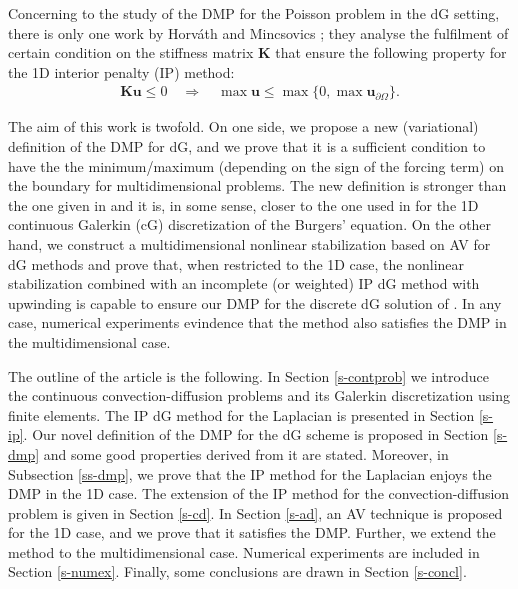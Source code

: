 Concerning to the study of the DMP for the Poisson problem in the dG setting, there is {only} one work by Horv\'ath and Mincsovics \cite{horvath_discrete_2013}; they analyse the fulfilment of certain condition on the stiffness matrix $\mathbf{K}$ that ensure the following property for the 1D interior penalty (IP) method:
\begin{align*}
\mathbf{Ku}\leq 0 \quad \Longrightarrow   \quad \max \mathbf{u} \leq \max\{0,\max \mathbf{u}_{\partial \Omega}\}. 
\end{align*} 

{The aim of this work is twofold. On one side, we propose a new (variational) definition of the DMP for dG, {and we prove that it is a sufficient condition to have the the minimum/maximum (depending on the sign of the forcing term) on the boundary for multidimensional problems}. The new definition is stronger than the one given in \cite{horvath_discrete_2013} and it is, in some sense, closer to the one used in \cite{burman_nonlinear_2007} for the 1D continuous Galerkin (cG) discretization of the Burgers' equation. On the other hand, we construct a multidimensional nonlinear stabilization based on AV for dG methods and prove that, when restricted to the 1D case, the nonlinear stabilization combined with an incomplete (or weighted) IP dG method with upwinding is capable to ensure our DMP for the discrete dG solution of . In any case, numerical experiments evindence that the method also satisfies the DMP in the multidimensional case.}


The outline of the article is the following. In Section \ref{s-contprob} we introduce the continuous convection-diffusion problems and its Galerkin discretization using finite elements. The IP dG method for the Laplacian is presented in Section \ref{s-ip}. Our novel definition of the DMP for the dG scheme is proposed in Section \ref{s-dmp} and some good properties derived from it are stated. Moreover, in Subsection \ref{ss-dmp}, we prove that the IP method for the Laplacian enjoys the DMP in the 1D case. The extension of the IP method for the convection-diffusion problem  is given in Section \ref{s-cd}. In Section \ref{s-ad}, an AV technique is proposed for the 1D case, and we prove that it satisfies the DMP. Further, we extend the method to the multidimensional case. Numerical experiments are included in Section \ref{s-numex}. Finally, some conclusions are drawn in Section \ref{s-concl}.


